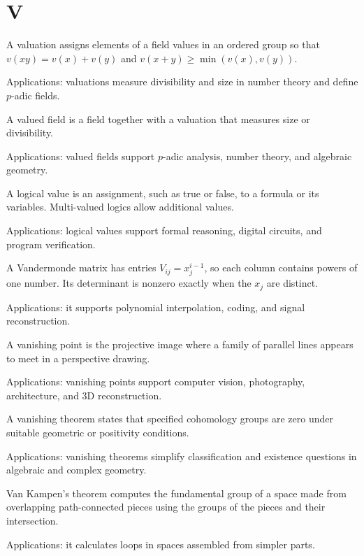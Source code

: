 \chapter*{V}
\label{chap:v}

A valuation assigns elements of a field values in an ordered group so that $v(xy)=v(x)+v(y)$ and $v(x+y)\geq\min(v(x),v(y))$. \par\noindent Applications: valuations measure divisibility and size in number theory and define $p$-adic fields.

A valued field is a field together with a valuation that measures size or divisibility. \par\noindent Applications: valued fields support $p$-adic analysis, number theory, and algebraic geometry.

A logical value is an assignment, such as true or false, to a formula or its variables. Multi-valued logics allow additional values. \par\noindent Applications: logical values support formal reasoning, digital circuits, and program verification.

A Vandermonde matrix has entries $V_{ij}=x_j^{i-1}$, so each column contains powers of one number. Its determinant is nonzero exactly when the $x_j$ are distinct. \par\noindent Applications: it supports polynomial interpolation, coding, and signal reconstruction.

A vanishing point is the projective image where a family of parallel lines appears to meet in a perspective drawing. \par\noindent Applications: vanishing points support computer vision, photography, architecture, and 3D reconstruction.

A vanishing theorem states that specified cohomology groups are zero under suitable geometric or positivity conditions. \par\noindent Applications: vanishing theorems simplify classification and existence questions in algebraic and complex geometry.

Van Kampen's theorem computes the fundamental group of a space made from overlapping path-connected pieces using the groups of the pieces and their intersection. \par\noindent Applications: it calculates loops in spaces assembled from simpler parts.

